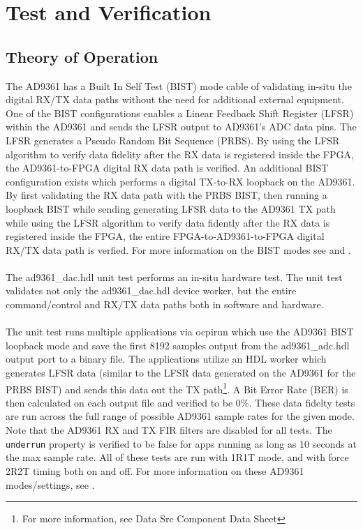 \documentclass{article}
\def\comp{ad9361\_dac}
\begin{document}
\section*{Test and Verification}
\subsection*{Theory of Operation}
The AD9361 has a Built In Self Test (BIST) mode cable of validating in-situ the digital RX/TX data paths without the need for additional external equipment. One of the BIST configurations enables a Linear Feedback Shift Register (LFSR) within the AD9361 and sends the LFSR output to AD9361's ADC data pins. The LFSR generates a Pseudo Random Bit Sequence (PRBS). By using the LFSR algorithm to verify data fidelity after the RX data is registered inside the FPGA, the AD9361-to-FPGA digital RX data path is verified. An additional BIST configuration exists which performs a digital TX-to-RX loopback on the AD9361. By first validating the RX data path with the PRBS BIST, then running a loopback BIST while sending generating LFSR data to the AD9361 TX path while using the LFSR algorithm to verify data fidently after the RX data is registered inside the FPGA, the entire FPGA-to-AD9361-to-FPGA digital RX/TX data path is verfied. For more information on the BIST modes see \cite{adi_bist_doc} and \cite{adi_ug570}. \\ \\
The \comp{}.hdl unit test performs an in-situ hardware test. The unit test validates not only the \comp{}.hdl device worker, but the entire command/control and RX/TX data paths both in software and hardware. \\ \\
The unit test runs multiple applications via ocpirun which use the AD9361 BIST loopback mode and save the first 8192 samples output from the ad9361\_adc.hdl output port to a binary file. The applications utilize an HDL worker which generates LFSR data (similar to the LFSR data generated on the AD9361 for the PRBS BIST) and sends this data out the TX path\footnote{For more information, see Data Src Component Data Sheet}. A Bit Error Rate (BER) is then calculated on each output file and verified to be 0\%. These data fidelty tests are run across the full range of possible AD9361 sample rates for the given mode. Note that the AD9361 RX and TX FIR filters are disabled for all tests. The \verb+underrun+ property is verified to be false for apps running as long as 10 seconds at the max sample rate. All of these tests are run with 1R1T mode, and with force 2R2T timing both on and off. For more information on these AD9361 modes/settings, see \cite{adi_ug570}.
\end{document}
